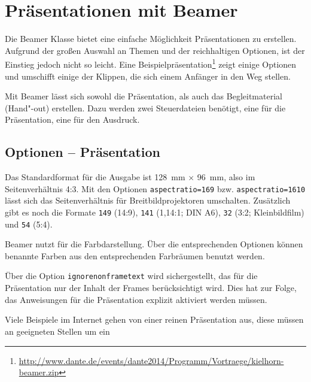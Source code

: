 \chapter{Präsentationen mit Beamer}

\noindent Die Beamer Klasse bietet eine einfache Möglichkeit Präsentationen zu
erstellen.  Aufgrund der großen Auswahl an Themen und der reichhaltigen
Optionen, ist der Einstieg jedoch nicht so leicht.  Eine
Beispielpräsentation\footnote{%
\url{http://www.dante.de/events/dante2014/Programm/Vortraege/kielhorn-beamer.zip}}
zeigt einige Optionen und umschifft einige der Klippen, die sich einem 
Anfänger in den Weg stellen.

Mit Beamer lässt sich sowohl die Präsentation, als auch das Begleitmaterial
(Hand"-out) erstellen.  Dazu werden zwei Steuerdateien benötigt, eine für die
Präsentation, eine für den Ausdruck.

\section{Optionen -- Präsentation}


Das Standardformat für die Ausgabe ist 128~mm $\times$ 96~mm, also im
Seitenverhältnis 4:3. Mit den Optionen \texttt{aspectratio=169} bzw.
\texttt{aspectratio=1610} lässt sich das Seitenverhältnis für
Breitbildprojektoren umschalten.  Zusätzlich gibt es noch die Formate
\texttt{149} (14:9), \texttt{141} (1,14:1; DIN A6), \texttt{32} (3:2;
Kleinbildfilm) und \texttt{54} (5:4).

Beamer nutzt  für die Farbdarstellung. Über die
entsprechenden Optionen können benannte Farben aus den entsprechenden
Farbräumen benutzt werden.

Über die Option \texttt{ignorenonframetext} wird sichergestellt, das für die
Präsentation nur der Inhalt der Frames berücksichtigt wird. Dies hat zur
Folge, das Anweisungen für die Präsentation explizit aktiviert werden
müssen.

Viele Beispiele im Internet gehen von einer reinen Präsentation aus, diese
müssen an geeigneten Stellen um ein

